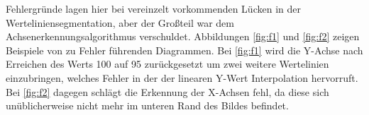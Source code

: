 Fehlergründe lagen hier bei vereinzelt vorkommenden Lücken in der Werteliniensegmentation, aber der Großteil war dem Achsenerkennungsalgorithmus verschuldet. Abbildungen \ref{fig:f1} und \ref{fig:f2} zeigen Beispiele von zu Fehler führenden Diagrammen. Bei \ref{fig:f1} wird die Y-Achse nach Erreichen des Werts 100 auf 95 zurückgesetzt um zwei weitere Wertelinien einzubringen, welches Fehler in der der linearen Y-Wert Interpolation hervorruft. Bei \ref{fig:f2} dagegen schlägt die Erkennung der X-Achsen fehl, da diese sich unüblicherweise nicht mehr im unteren Rand des Bildes befindet.


























